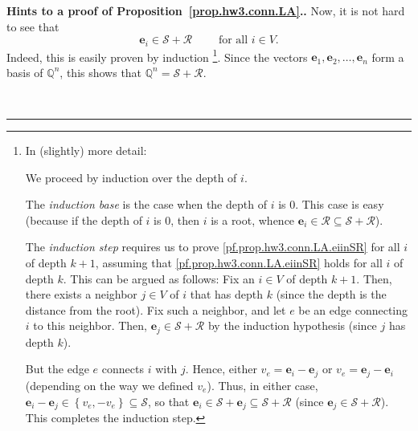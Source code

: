 \documentclass[numbers=enddot,12pt,final,onecolumn,notitlepage]{scrartcl}%
\theoremstyle{definition}
\newenvironment{proof}[1][Proof]{\noindent\textbf{#1.} }{\ \rule{0.5em}{0.5em}}
\newcommand{\QQ}{\mathbb{Q}}
\newcommand{\set}[1]{\left\{ #1 \right\}}
\begin{document}
\begin{proof}[Hints to a proof of Proposition~\ref{prop.hw3.conn.LA}.]
Now, it is not hard to see that
\begin{equation}
\mathbf{e}_i \in \mathcal{S} + \mathcal{R}
\qquad \text{ for all } i \in V .
\label{pf.prop.hw3.conn.LA.eiinSR}
\end{equation}
Indeed, this is easily proven by induction%
\footnote{In (slightly) more detail:
  \par
  We proceed by induction over the depth of $i$.
  \par
  The \textit{induction base} is the case when the depth
  of $i$ is $0$.
  This case is easy (because if the depth of $i$ is $0$,
  then $i$ is a root, whence $\mathbf{e}_i \in \mathcal{R}
  \subseteq \mathcal{S} + \mathcal{R}$).
  \par
  The \textit{induction step} requires us to prove
  \eqref{pf.prop.hw3.conn.LA.eiinSR} for all $i$ of depth
  $k+1$, assuming that \eqref{pf.prop.hw3.conn.LA.eiinSR}
  holds for all $i$ of depth $k$.
  This can be argued as follows:
  Fix an $i \in V$ of depth $k+1$.
  Then, there exists a neighbor $j \in V$ of $i$ that has
  depth $k$ (since the depth is the distance from the
  root).
  Fix such a neighbor, and let $e$ be an edge connecting
  $i$ to this neighbor.
  Then, $\mathbf{e}_j \in \mathcal{S} + \mathcal{R}$
  by the induction hypothesis (since $j$ has depth $k$).
  \par
  But the edge $e$ connects $i$ with $j$.
  Hence, either $v_e = \mathbf{e}_i - \mathbf{e}_j$ or
  $v_e = \mathbf{e}_j - \mathbf{e}_i$ (depending on the
  way we defined $v_e$).
  Thus, in either case,
  $\mathbf{e}_i - \mathbf{e}_j \in \set{v_e, -v_e}
  \subseteq \mathcal{S}$, so that
  $\mathbf{e}_i \in \mathcal{S} + \mathbf{e}_j
  \subseteq \mathcal{S} + \mathcal{R}$
  (since $\mathbf{e}_j \in \mathcal{S} + \mathcal{R}$).
  This completes the induction step.}.
Since the vectors $\mathbf{e}_1, \mathbf{e}_2, \ldots,
\mathbf{e}_n$ form a basis of $\QQ^n$,
this shows that
$\QQ^n = \mathcal{S} + \mathcal{R}$.


\end{proof}
\end{document}

